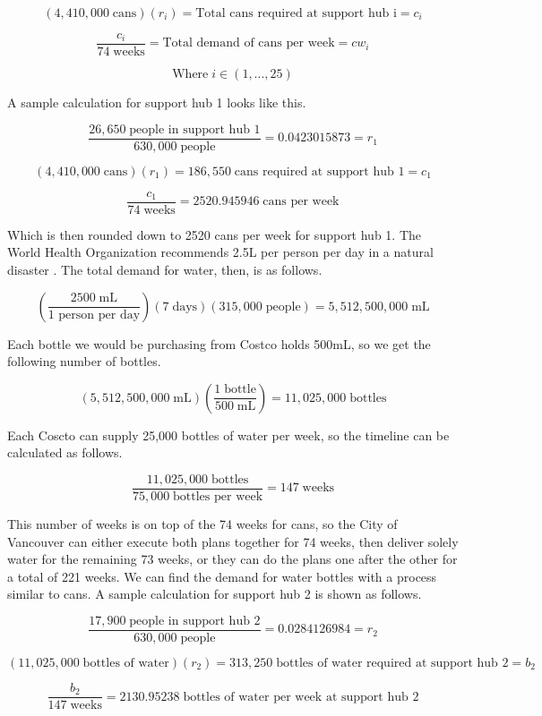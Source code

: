 \documentclass{article}
\begin{document}
\[(4,410,000\;\text{cans})(r_{i}) = \text{Total cans required at support hub i} = c_{i}\]

\[\frac{c_i}{74\;\text{weeks}} = \text{Total demand of cans per week} = cw_i\]

\[\text{Where} \;i\in(1,...,25)\]

A sample calculation for support hub 1 looks like this.

\[\frac{26,650\;\text{people in support hub 1}}{630,000\;\text{people}} = 0.0423015873 = r_1\]

\[(4,410,000\;\text{cans})(r_1) = 186,550\;\text{cans required at support hub 1} = c_1\]

\[\frac{c_1}{74\;\text{weeks}} = 2520.945946\;\text{cans per week}\]

Which is then rounded down to 2520 cans per week for support hub 1. The World Health Organization recommends 2.5L per person per day in a natural disaster \cite{WHO}. The total demand for water, then, is as follows.

\[(\frac{2500\;\text{mL}}{\text{1 person per day}})(7\;\text{days})(315,000 \;\text{people}) = 5,512,500,000\;\text{mL}\]

Each bottle we would be purchasing from Costco holds 500mL, so we get the following number of bottles.

\[(5,512,500,000\;\text{mL})(\frac{1\;\text{bottle}}{500\;\text{mL}}) = 11,025,000\;\text{bottles}\]

Each Coscto can supply 25,000 bottles of water per week, so the timeline can be calculated as follows.

\[\frac{11,025,000\;\text{bottles}}{75,000\;\text{bottles per week}} = 147\;\text{weeks}\]

This number of weeks is on top of the 74 weeks for cans, so the City of Vancouver can either execute both plans together for 74 weeks, then deliver solely water for the remaining 73 weeks, or they can do the plans one after the other for a total of 221 weeks. We can find the demand for water bottles with a process similar to cans. A sample calculation for support hub 2 is shown as follows. 

\[\frac{17,900\;\text{people in support hub 2}}{630,000\;\text{people}} = 0.0284126984 = r_2\]

\[(11,025,000\;\text{bottles of water})(r_2) = 313,250\;\text{bottles of water required at support hub 2} = b_2\]

\[\frac{b_2}{147\;\text{weeks}} = 2130.95238\;\text{bottles of water per week at support hub 2}\]
\end{document}
